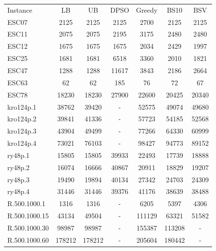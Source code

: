\documentclass[]{article}
\begin{document}
    \begin{table}[htb]
		\begin{tabular}{lcccccc}
			Instance       & LB     &    UB      & DPSO   &   Greedy &   BS10   &   BSV   \\
			ESC07          & 2125   &    2125    & 2125   &   2700   &   2125   &   2125  \\
			ESC11          & 2075   &    2075    & 2195   &   3175   &   2480   &   2480  \\
			ESC12          & 1675   &    1675    & 1675   &   2034   &   2429   &   1997  \\
			ESC25          & 1681   &    1681    & 6518   &   3360   &   2010   &   1821  \\
			ESC47          & 1288   &    1288    & 11617  &   3843   &   2186   &   2664  \\
			ESC63          & 62     &    62      & 185    &   76     &   72     &   67    \\
			ESC78          & 18230  &    18230   & 27900  &   22600  &   20425  &   20340 \\
			kro124p.1      & 38762  &    39420   & -      &   52575  &   49074  &   49680 \\
			kro124p.2      & 39841  &    41336   & -      &   57723  &   54185  &   52568 \\
			kro124p.3      & 43904  &    49499   & -      &   77266  &   64330  &   60999 \\
			kro124p.4      & 73021  &    76103   & -      &   98427  &   94773  &   89152 \\
			ry48p.1        & 15805  &    15805   & 39933  &   22493  &   17739  &   18888 \\
			ry48p.2        & 16074  &    16666   & 40867  &   20911  &   18829  &   19207 \\
			ry48p.3        & 19490  &    19894   & 40134  &   27342  &   24703  &   24309 \\
			ry48p.4        & 31446  &    31446   & 39376  &   41176  &   38639  &   38488 \\
			R.500.1000.1   & 1316   &    1316    & -      &   6205   &   5397   &   4306  \\
			R.500.1000.15  & 43134  &    49504   & -      &   111129 &   63321  &   51582 \\
			R.500.1000.30  & 98987  &    98987   & -      &   155387 &   113208 &   -     \\
			R.500.1000.60  & 178212 &    178212  & -      &   205604 &   180442 &   -     \\

\end{tabular}
\end{table}
\end{document}
